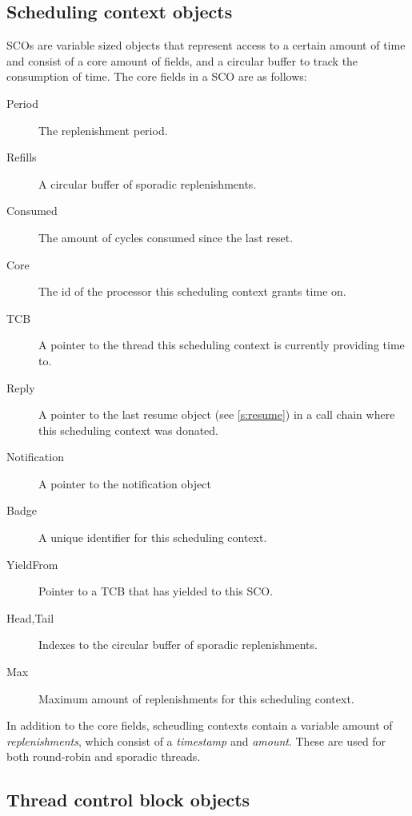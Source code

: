 \subsection{Scheduling context objects}
\label{s:sco}

\glspl{SCO} are variable sized objects that represent access to a certain amount of time and
consist of a core amount of fields, and a circular buffer to track the consumption of time.
The core fields in a \gls{SCO} are as follows:


\begin{description}
    \item[Period] The replenishment period.
    \item[Refills] A circular buffer of sporadic replenishments.
    \item[Consumed] The amount of cycles consumed since the last reset.
    \item[Core] The id of the processor this scheduling context grants time on.
    \item[TCB] A pointer to the thread this scheduling context is currently providing time to.
    \item[Reply] A pointer to the last resume object (see \cref{s:resume}) in a call chain where
        this scheduling context was donated.
    \item[Notification] A pointer to the notification object
    \item[Badge] A unique identifier for this scheduling context.
    \item[YieldFrom] Pointer to a \gls{TCB} that has yielded to this \gls{SCO}.
    \item[Head,Tail] Indexes to the circular buffer of sporadic replenishments.
    \item[Max] Maximum amount of replenishments for this scheduling context.
\end{description}

In addition to the core fields, scheudling contexts contain a variable amount of
\emph{replenishments}, which consist of a \emph{timestamp} and \emph{amount}. These are used for
both round-robin and sporadic threads.


\subsection{Thread control block objects}

